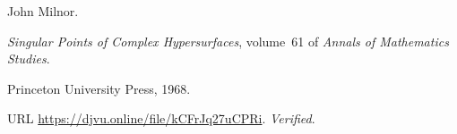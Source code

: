 John Milnor.

\newblock \emph{Singular Points of Complex Hypersurfaces}, volume~61 of
  \emph{Annals of Mathematics Studies}.

\newblock Princeton University Press, 1968.

\newblock URL \url{https://djvu.online/file/kCFrJq27uCPRi}.
\newblock \emph{Verified}.

